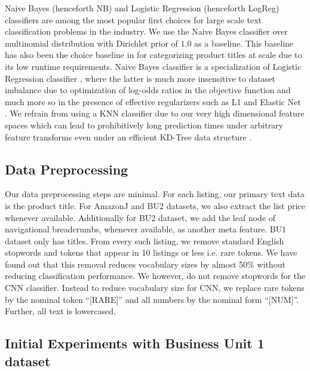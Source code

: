 \vspace{-0.1cm}

Naive Bayes (henceforth NB) and Logistic Regression (henceforth LogReg) classifiers are among the most popular first choices for large scale text classification problems in the industry.
We use the Naive Bayes classifier over multinomial distribution with Dirichlet prior of $1.0$ as a baseline.
This baseline has also been the choice baseline in \cite{Shen12, Sun14} for categorizing product titles at scale due to its low runtime requirements.
Naive Bayes classifier is a specialization of Logistic Regression classifier \cite{Ng01}, where the latter is much more insensitive to dataset imbalance due to optimization of log-odds ratios in the objective function and much more so in the presence of effective regularizers such as L1 and Elastic Net \cite{ESL03, Zhang04:SGD, Zou05:EN}.
We refrain from using a KNN classifier due to our very high dimensional feature spaces which can lead to prohibitively long prediction times under arbitrary feature transforms even under an efficient KD-Tree data structure \cite{Manning08:IR}.

\vspace{-0.2cm}
\subsection{Data Preprocessing}
\label{Subsect:Data-preprocessing}
\vspace{-0.2cm}

Our data preprocessing steps are minimal.
For each listing, our primary text data is the product title. 
For AmazonJ and BU2 datasets, we also extract the list price whenever available. 
Additionally for BU2 dataset, we add the leaf node of navigational breadcrumbs, whenever available, as another meta feature.
BU1 dataset only has titles.
From every such listing, we remove standard English stopwords and tokens that appear in 10 listings or less i.e. rare tokens. 
We have found out that this removal reduces vocabulary sizes by almost 50\% without reducing classification performance.
We however, do not remove stopwords for the CNN classifier.
Instead to reduce vocabulary size for CNN, we replace rare tokens by the nominal token ``[RARE]'' and all numbers by the nominal form ``[NUM]''.
Further, all text is lowercased.

\vspace{-0.1cm}
\subsection{Initial Experiments with Business Unit 1 dataset}
\label{Subsect:BU1-exp}

